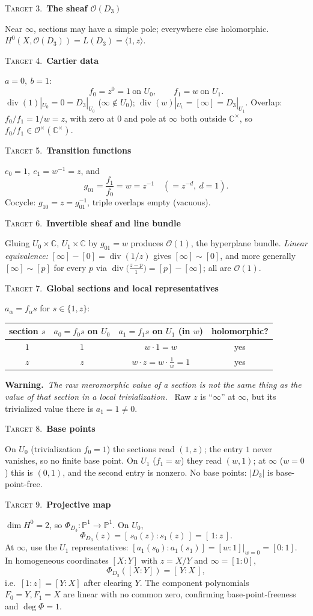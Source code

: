 \documentclass[11pt]{article}
\newcommand{\PP}{\mathbb P}
\newcommand{\CC}{\mathbb C}
\newcommand{\OO}{\mathcal O}
\newcommand{\divisor}{\operatorname{div}}
\newcommand{\target}[2]{\medskip\noindent%
  {\small\textsc{\textcolor{accent}{Target #1.}}}\ \textbf{\textcolor{inkblue}{#2}}\par\nopagebreak\smallskip}
\newcommand{\warningnote}{\par\smallskip\noindent%
  {\color{polered}\textbf{Warning.}}\ \emph{The raw meromorphic value of a section
  is not the same thing as the value of that section in a local trivialization.}\ }
\theoremstyle{plain}
\theoremstyle{definition}
\begin{document}
\target{3}{The sheaf \(\OO(D_3)\)}
Near $\infty$, sections may have a simple pole; everywhere else holomorphic.
$H^0(X,\OO(D_3))=L(D_3)=\langle1,z\rangle$.

\target{4}{Cartier data}
$a=0,\ b=1$:
\[
  f_0=z^{0}=1\ \text{on }U_0,\qquad f_1=w\ \text{on }U_1 .
\]
$\divisor(1)|_{U_0}=0=D_3|_{U_0}$ ($\infty\notin U_0$); $\divisor(w)|_{U_1}=[\infty]
=D_3|_{U_1}$. Overlap: $f_0/f_1=1/w=z$, with zero at $0$ and pole at $\infty$ both
outside $\CC^\times$, so $f_0/f_1\in\OO^\times(\CC^\times)$.

\target{5}{Transition functions}
$e_0=1,\ e_1=w^{-1}=z$, and
\[
  g_{01}=\frac{f_1}{f_0}=w=z^{-1}\quad(=z^{-d},\ d=1).
\]
Cocycle: $g_{10}=z=g_{01}^{-1}$, triple overlaps empty (vacuous).

\target{6}{Invertible sheaf and line bundle}
Gluing $U_0\times\CC,\,U_1\times\CC$ by $g_{01}=w$ produces $\OO(1)$, the
hyperplane bundle. \emph{Linear equivalence:} $[\infty]-[0]=\divisor(1/z)$ gives
$[\infty]\sim[0]$, and more generally $[\infty]\sim[p]$ for every $p$ via
$\divisor\!\big(\tfrac{z-p}{1}\big)=[p]-[\infty]$; all are $\OO(1)$.

\target{7}{Global sections and local representatives}
$a_\alpha=f_\alpha s$ for $s\in\{1,z\}$:
\begin{center}\small
\begin{tabular}{cccc}
\toprule
section $s$ & $a_0=f_0 s$ on $U_0$ & $a_1=f_1 s$ on $U_1$ (in $w$) & holomorphic?\\
\midrule
$1$ & $1$ & $w\cdot1=w$            & yes\\
$z$ & $z$ & $w\cdot z=w\cdot\tfrac1w=1$ & yes\\
\bottomrule
\end{tabular}
\end{center}
\warningnote
Raw $z$ is ``$\infty$'' at $\infty$, but its trivialized value there is
$a_1=1\neq0$.

\target{8}{Base points}
On $U_0$ (trivialization $f_0=1$) the sections read $(1,z)$; the entry $1$ never
vanishes, so no finite base point. On $U_1$ ($f_1=w$) they read $(w,1)$; at
$\infty$ ($w=0$) this is $(0,1)$, and the second entry is nonzero. No base
points: $|D_3|$ is base-point-free.

\target{9}{Projective map}
$\dim H^0=2$, so $\Phi_{D_3}\colon\PP^1\to\PP^1$. On $U_0$,
\[
  \Phi_{D_3}(z)=[\,s_0(z):s_1(z)\,]=[\,1:z\,].
\]
At $\infty$, use the $U_1$ representatives: $[a_1(s_0):a_1(s_1)]=[w:1]\big|_{w=0}
=[0:1]$. In homogeneous coordinates $[X:Y]$ with $z=X/Y$ and $\infty=[1:0]$,
\[
  \Phi_{D_3}([X:Y])=[\,Y:X\,],
\]
i.e.\ $[1:z]=[Y:X]$ after clearing $Y$. The component polynomials $F_0=Y,F_1=X$
are linear with no common zero, confirming base-point-freeness and $\deg\Phi=1$.
\end{document}
